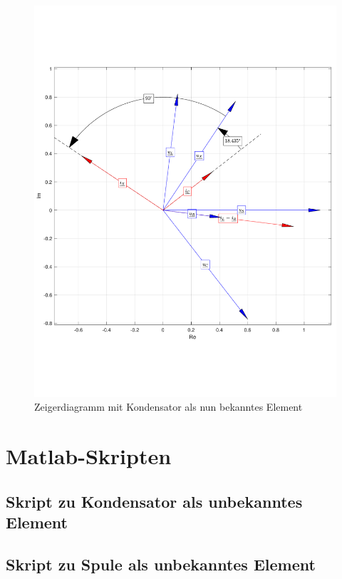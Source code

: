 \documentclass[11pt]{scrartcl}
\begin{document}
\begin{figure}[!htb]
    \begin{center}
      \includegraphics[width=0.9\linewidth]{./Assets/gesamt_TEST.pdf}
    \caption{Zeigerdiagramm mit Kondensator als nun bekanntes Element}
    \label{fig:diagramm-kond-bekannt}
  \end{center}
\end{figure}



\newpage
\section{Matlab-Skripten}
\label{sec:matlab-skripten-1}

\subsection{Skript zu Kondensator als unbekanntes Element}
\label{sec:skript-zu-kond}



\subsection{Skript zu Spule als unbekanntes Element}
\label{sec:skript-zu-spule}

\end{document}

